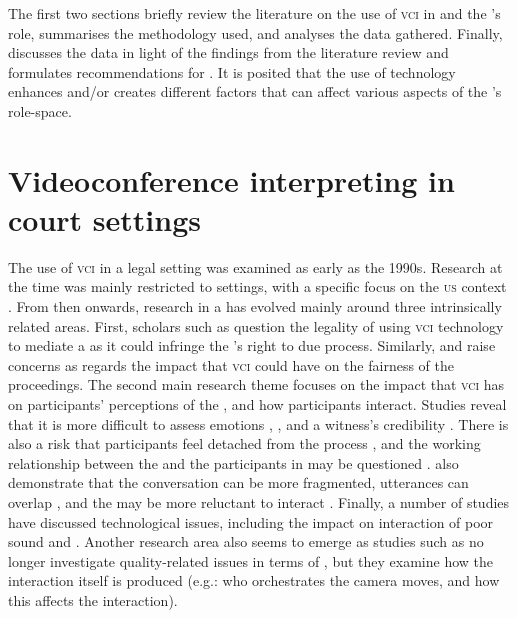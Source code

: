 \documentclass[output=paper]{langsci/langscibook}
\begin{document}
The first two sections briefly review the literature on the use of \textsc{vci}  in  and the ’s role,  summarises the methodology used, and  analyses the data gathered. Finally,  discusses the data in light of the findings from the literature review and formulates recommendations for . It is posited that the use of technology enhances and/or creates different factors that can affect various aspects of the ’s role-space.  

\section{Videoconference interpreting in court settings}
\label{sec:devaux:2}
The use of \textsc{vci}  in a legal setting was examined as early as the 1990s. Research at the time was mainly restricted to   settings, with a specific focus on the \textsc{us}  context \citep{Radburn-Remfry1994,Thaxton1993}. From then onwards, research in a  has evolved mainly around three intrinsically related areas. First, scholars such as \citet{Johnson2006} question the legality of using \textsc{vci} technology to mediate a  as it could infringe the ’s right to due process. Similarly, \citet{Radburn-Remfry1994} and \citet{Thaxton1993} raise concerns as regards the impact that \textsc{vci}  could have on the fairness of the  proceedings. The second main research theme focuses on the impact that \textsc{vci}  has on participants’ perceptions of the , and how  participants interact. Studies reveal that it is more difficult to assess emotions \citep{Radburn-Remfry1994},  \citep{Fullwood2008}, and a witness’s credibility \citep{Roth2000}. There is also a risk that participants feel detached from the process \citep{McKay2016}, and the working relationship between the  and the participants in  may be questioned \citep{Hodges2008}. \citet{Verdier2011} also demonstrate that the conversation can be more fragmented, utterances can overlap \citep{Licoppe2015}, and the  may be more reluctant to interact \citep{Licoppe2014}. Finally, a number of studies have discussed technological issues, including the impact on interaction of poor sound and  \citep{Haas2006, Plotnikoff2000}. Another research area also seems to emerge as studies such as \citet{Licoppe2013} no longer investigate quality-related issues in terms of , but they examine how the interaction itself is produced (e.g.: who orchestrates the camera moves, and how this affects the interaction). 
\end{document}
